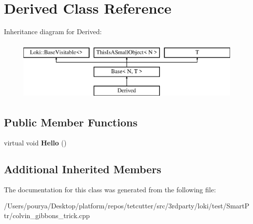\hypertarget{classDerived}{}\section{Derived Class Reference}
\label{classDerived}
Inheritance diagram for Derived\+:\begin{figure}[H]
\begin{center}
\leavevmode
\includegraphics[height=3.000000cm]{classDerived}
\end{center}
\end{figure}
\subsection*{Public Member Functions}
\begin{DoxyCompactItemize}
\item 
\hypertarget{classDerived_adf6b8bb4e871a49a9c6ebbee55348724}{}virtual void {\bfseries Hello} ()\label{classDerived_adf6b8bb4e871a49a9c6ebbee55348724}

\end{DoxyCompactItemize}
\subsection*{Additional Inherited Members}


The documentation for this class was generated from the following file\+:\begin{DoxyCompactItemize}
\item 
/\+Users/pourya/\+Desktop/platform/repos/tetcutter/src/3rdparty/loki/test/\+Smart\+Ptr/colvin\+\_\+gibbons\+\_\+trick.\+cpp\end{DoxyCompactItemize}
